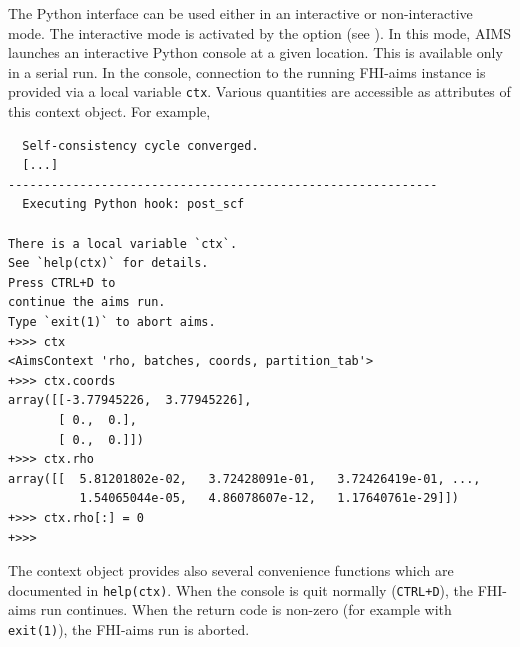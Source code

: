 The Python interface can be used either in an interactive or non-interactive
mode.
The interactive mode is activated by the option  (see
).
In this mode, AIMS launches an interactive Python console at a given location.
This is available only in a serial run.
In the console, connection to the running FHI-aims instance is provided via
a local variable \verb+ctx+.
Various quantities are accessible as attributes of this context object.
For example,
\begin{verbatim}
  Self-consistency cycle converged.
  [...]
------------------------------------------------------------
  Executing Python hook: post_scf

There is a local variable `ctx`.
See `help(ctx)` for details.
Press CTRL+D to
continue the aims run.
Type `exit(1)` to abort aims.
+>>> ctx
<AimsContext 'rho, batches, coords, partition_tab'>
+>>> ctx.coords
array([[-3.77945226,  3.77945226],
       [ 0.,  0.],
       [ 0.,  0.]])
+>>> ctx.rho
array([[  5.81201802e-02,   3.72428091e-01,   3.72426419e-01, ...,
          1.54065044e-05,   4.86078607e-12,   1.17640761e-29]])
+>>> ctx.rho[:] = 0
+>>>
\end{verbatim}
The context object provides also several convenience functions which are
documented in \verb+help(ctx)+.
When the console is quit normally (\verb-CTRL+D-), the FHI-aims run continues.
When the return code is non-zero (for example with \verb+exit(1)+), the
FHI-aims run is aborted.


